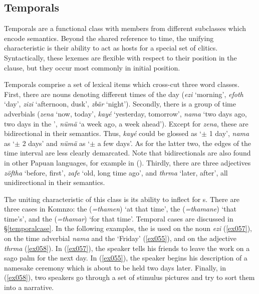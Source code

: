 \subsection{Temporals} \label{temporals-sec}

Temporals are a functional class with members from different  subclasses which encode  semantics. Beyond the shared reference to time, the unifying characteristic is their ability to act as hosts for a special set of   clitics. Syntactically, these lexemes are flexible with respect to their position in the clause, but they occur most commonly in initial position.

Temporals comprise a set of lexical items which cross-cut three word classes. First, there are nouns denoting different times of the day (\emph{ezi} `morning', \emph{efoth} `day', \emph{zizi} `afternoon, dusk', \emph{zbär} `night'). Secondly, there is a group of time adverbials (\emph{zena} `now, today', \emph{kayé} `yesterday, tomorrow', \emph{nama} `two days ago, two days in the ', \emph{nümä} `a week ago, a week ahead'). Except for \emph{zena}, these are bidirectional in their semantics. Thus, \emph{kayé} could be glossed as `$\pm$ 1 day', \emph{nama} as `$\pm$ 2 days' and \emph{nümä} as `$\pm$ a few days'. As for the latter two, the edges of the time interval are less clearly demarcated. Note that bidirectionals are also found in other Papuan languages, for example in  (\citealt[70]{Reesink:1987vg}). Thirdly, there are three adjectives \emph{zöftha} `before, first', \emph{zafe} `old, long time ago', and \emph{thrma} `later, after', all unidirectional in their semantics.

The uniting characteristic of this class is its ability to inflect for  s. There are three  cases in Komnzo: the   (\emph{=thamen}) `at that time', the   (\emph{=thamane}) `that time's', and the   (\emph{=thamar}) `for that time'. Temporal cases are discussed in {\S}\ref{temporalcase}. In the following examples, the    is used on the noun \emph{ezi} (\ref{ex057}), on the time adverbial \emph{nama} and the   `Friday' (\ref{ex055}), and on the  adjective \emph{thrma} (\ref{ex058}). In (\ref{ex057}), the speaker tells his friends to leave the work on a sago palm for the next day. In (\ref{ex055}), the speaker begins his description of a namesake ceremony which is about to be held two days later. Finally, in (\ref{ex058}), two speakers go through a set of stimulus pictures and try to sort them into a narrative.


